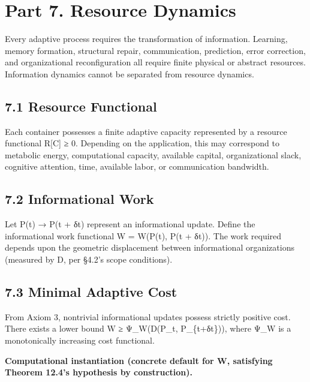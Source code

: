 \documentclass[
]{article}
\begin{document}
\hypertarget{part-7.-resource-dynamics}{%
\section{Part 7. Resource Dynamics}\label{part-7.-resource-dynamics}}

Every adaptive process requires the transformation of information.
Learning, memory formation, structural repair, communication,
prediction, error correction, and organizational reconfiguration all
require finite physical or abstract resources. Information dynamics
cannot be separated from resource dynamics.

\hypertarget{resource-functional}{%
\subsection{7.1 Resource Functional}\label{resource-functional}}

Each container possesses a finite adaptive capacity represented by a
resource functional R{[}C{]} ≥ 0. Depending on the application, this may
correspond to metabolic energy, computational capacity, available
capital, organizational slack, cognitive attention, time, available
labor, or communication bandwidth.

\hypertarget{informational-work}{%
\subsection{7.2 Informational Work}\label{informational-work}}

Let P(t) → P(t + δt) represent an informational update. Define the
informational work functional W = W(P(t), P(t + δt)). The work required
depends upon the geometric displacement between informational
organizations (measured by D, per §4.2's scope conditions).

\hypertarget{minimal-adaptive-cost}{%
\subsection{7.3 Minimal Adaptive Cost}\label{minimal-adaptive-cost}}

From Axiom 3, nontrivial informational updates possess strictly positive
cost. There exists a lower bound W ≥ Ψ\_W(D(P\_t, P\_\{t+δt\})), where
Ψ\_W is a monotonically increasing cost functional.

\textbf{Computational instantiation (concrete default for W, satisfying
Theorem 12.4's hypothesis by construction).}
\end{document}
